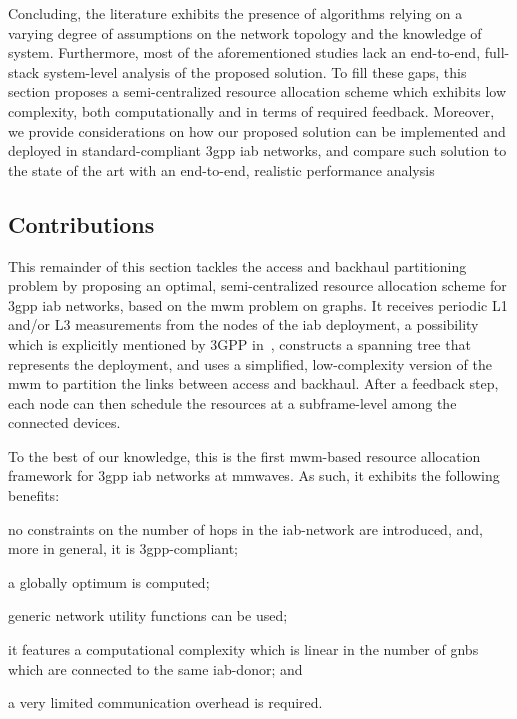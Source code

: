 Concluding, the literature exhibits the presence of algorithms relying on a varying degree of assumptions on the network topology and the knowledge of system. Furthermore, most of the aforementioned studies lack an end-to-end, full-stack system-level analysis of the proposed solution.
To fill these gaps, this section proposes a semi-centralized resource allocation scheme which exhibits low complexity, both computationally and in terms of required feedback. Moreover, we provide considerations on how our proposed solution can be implemented and deployed in standard-compliant \gls{3gpp} \gls{iab} networks, and compare such solution to the state of the art with an end-to-end, realistic performance analysis

\subsection{Contributions}
\label{sec:contributions}

This remainder of this section tackles the access and backhaul partitioning problem by proposing an optimal, semi-centralized resource allocation scheme for \gls{3gpp} \gls{iab} networks, based on the \gls{mwm} problem on graphs. It receives periodic L1 and/or L3 measurements from the nodes of the \gls{iab} deployment, a possibility which is explicitly mentioned by 3GPP in~\cite[Section 7.3.3]{3gpp_38_874}, constructs a spanning tree that represents the deployment, and uses a simplified, low-complexity version of the \gls{mwm} to partition the links between access and backhaul. After a feedback step, each node can then schedule the resources at a subframe-level among the connected devices. 

To the best of our knowledge, this is the first \gls{mwm}-based resource allocation framework for \gls{3gpp} \gls{iab} networks at \glspl{mmwave}. As such, it exhibits the following benefits:
\begin{enumerate*}[label=(\roman*)]
  \item no constraints on the number of hops in the \gls{iab}-network are introduced, and, more in general, it is \gls{3gpp}-compliant;
  \item a globally optimum is computed;
  \item generic network utility functions can be used;
  \item it features a computational complexity which is linear in the number of \glspl{gnb} which are connected to the same \gls{iab}-donor; and 
  \item a very limited communication overhead is required.
\end{enumerate*}

